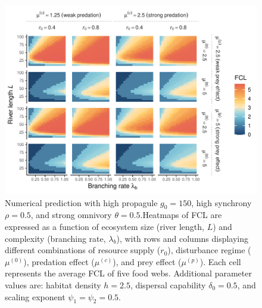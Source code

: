 \begin{figure}
\centering
\includegraphics{../data_fmt/fig_rho05_g150_theta05.pdf}
\caption{Numerical prediction with high propagule \(g_0 = 150\), high
synchrony \(\rho = 0.5\), and strong omnivory \(\theta = 0.5\).Heatmaps
of FCL are expressed as a function of ecosystem size (river length,
\(L\)) and complexity (branching rate, \(\lambda_b\)), with rows and
columns displaying different combinations of resource supply (\(r_0\)),
disturbance regime (\(\mu^{(0)}\)), predation effect (\(\mu^{(c)}\)),
and prey effect (\(\mu^{(p)}\)). Each cell represents the average FCL of
five food webs. Additional parameter values are: habitat density
\(h=2.5\), dispersal capability \(\delta_0=0.5\), and scaling exponent
\(\psi_1=\psi_2=0.5\).\label{fig:fig-num8}}
\end{figure}

\newpage
